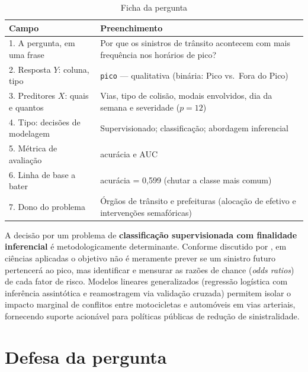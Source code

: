 \documentclass[
  article,
  12pt,
  oneside,
  a4paper,
  english,
  brazil
]{abntex2}\usepackage[]{graphicx}\usepackage[]{xcolor}
\begin{document}
\begin{table}[htb]
  \centering
  \caption{Ficha da pergunta}
  \label{tab:ficha}
  \footnotesize
  \begin{tabular}{@{}p{}p{}@{}}
    \toprule
    \textbf{Campo} & \textbf{Preenchimento} \\
    \midrule
    1. A pergunta, em uma frase & Por que os sinistros de trânsito acontecem com mais frequência nos horários de pico? \\
    2. Resposta $Y$: coluna, tipo & \texttt{pico} --- qualitativa (binária: Pico vs.\ Fora do Pico) \\
    3. Preditores $X$: quais e quantos & Vias, tipo de colisão, modais envolvidos, dia da semana e severidade ($p = \text{12}$) \\
    4. Tipo: decisões de modelagem & Supervisionado; classifica\c{c}\~ao; abordagem inferencial \\
    5. Métrica de avaliação & acur\'acia e AUC \\
    6. Linha de base a bater & acur\'acia = 0,599 \quad (chutar a classe mais comum) \\
    7. Dono do problema & Órgãos de trânsito e prefeituras (alocação de efetivo e intervenções semafóricas) \\
    \bottomrule
  \end{tabular}
\end{table}

A decisão por um problema de \textbf{classificação supervisionada com finalidade inferencial} é metodologicamente determinante. Conforme discutido por , em ciências aplicadas o objetivo não é meramente prever se um sinistro futuro pertencerá ao pico, mas identificar e mensurar as razões de chance (\textit{odds ratios}) de cada fator de risco. Modelos lineares generalizados (regressão logística com inferência assintótica e reamostragem via validação cruzada) permitem isolar o impacto marginal de conflitos entre motocicletas e automóveis em vias arteriais, fornecendo suporte acionável para políticas públicas de redução de sinistralidade.

\section{Defesa da pergunta}
\end{document}
